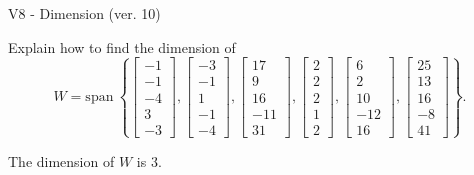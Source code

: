 \begin{exercise}
  \begin{exerciseTitle}V8 - Dimension (ver. 10)\end{exerciseTitle}
  \begin{exerciseStatement}
    Explain how to find the dimension of 
\[W=\mathrm{span}\ \left\{\left[\begin{array}{r}
-1 \\
-1 \\
-4 \\
3 \\
-3
\end{array}\right] , \left[\begin{array}{r}
-3 \\
-1 \\
1 \\
-1 \\
-4
\end{array}\right] , \left[\begin{array}{r}
17 \\
9 \\
16 \\
-11 \\
31
\end{array}\right] , \left[\begin{array}{r}
2 \\
2 \\
2 \\
1 \\
2
\end{array}\right] , \left[\begin{array}{r}
6 \\
2 \\
10 \\
-12 \\
16
\end{array}\right] , \left[\begin{array}{r}
25 \\
13 \\
16 \\
-8 \\
41
\end{array}\right]\right\}.\]



  \end{exerciseStatement}
  \begin{exerciseAnswer}
   The dimension of \(W\) is  \(3\).
  


  \end{exerciseAnswer}
\end{exercise}